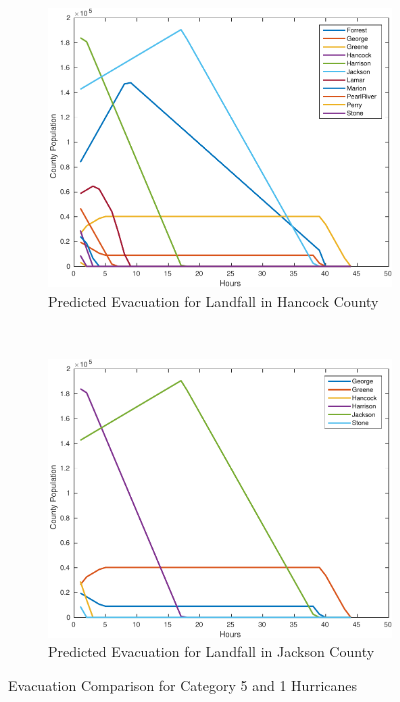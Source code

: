\documentclass[titlepage]{article}
\begin{document}
    \begin{figure}[H]
      \center
      \begin{subfigure}[b]{0.5\textwidth}
        \center
        \includegraphics[width=\linewidth]{figures/pred_hancock-crop.pdf}
        \caption{Predicted Evacuation for Landfall in Hancock County}
        \label{fig:stochastic_out_large}
      \end{subfigure}~
      \begin{subfigure}[b]{0.5\textwidth}
        \center
        \includegraphics[width=\linewidth]{figures/pred_jackson-crop.pdf}
        \caption{Predicted Evacuation for Landfall in Jackson County}
        \label{fig:stochastic_out_small}
      \end{subfigure}
      \caption{Evacuation Comparison for Category 5 and 1 Hurricanes}
      \label{fig:stochastic_out}
    \end{figure}
\end{document}
